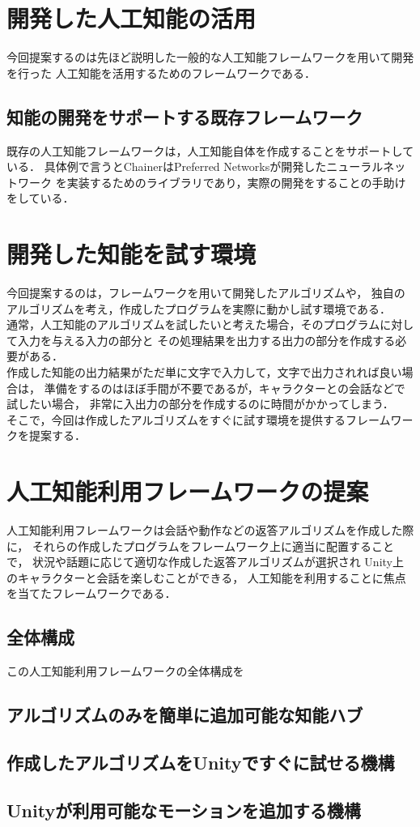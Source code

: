 \section{開発した人工知能の活用}
今回提案するのは先ほど説明した一般的な人工知能フレームワークを用いて開発を行った
人工知能を活用するためのフレームワークである．\\
\subsection{知能の開発をサポートする既存フレームワーク}
既存の人工知能フレームワークは，人工知能自体を作成することをサポートしている．
具体例で言うとChainerはPreferred Networksが開発したニューラルネットワーク
を実装するためのライブラリであり，実際の開発をすることの手助けをしている．
\section{開発した知能を試す環境}
今回提案するのは，フレームワークを用いて開発したアルゴリズムや，
独自のアルゴリズムを考え，作成したプログラムを実際に動かし試す環境である．\\

通常，人工知能のアルゴリズムを試したいと考えた場合，そのプログラムに対して入力を与える入力の部分と
その処理結果を出力する出力の部分を作成する必要がある．\\

作成した知能の出力結果がただ単に文字で入力して，文字で出力されれば良い場合は，
準備をするのはほぼ手間が不要であるが，キャラクターとの会話などで試したい場合，
非常に入出力の部分を作成するのに時間がかかってしまう．\\

そこで，今回は作成したアルゴリズムをすぐに試す環境を提供するフレームワークを提案する．
\section{人工知能利用フレームワークの提案}
人工知能利用フレームワークは会話や動作などの返答アルゴリズムを作成した際に，
それらの作成したプログラムをフレームワーク上に適当に配置することで，
状況や話題に応じて適切な作成した返答アルゴリズムが選択され
Unity上のキャラクターと会話を楽しむことができる，
人工知能を利用することに焦点を当てたフレームワークである．
\subsection{全体構成}
この人工知能利用フレームワークの全体構成を


\subsection{アルゴリズムのみを簡単に追加可能な知能ハブ}
\subsection{作成したアルゴリズムをUnityですぐに試せる機構}
\subsection{Unityが利用可能なモーションを追加する機構}